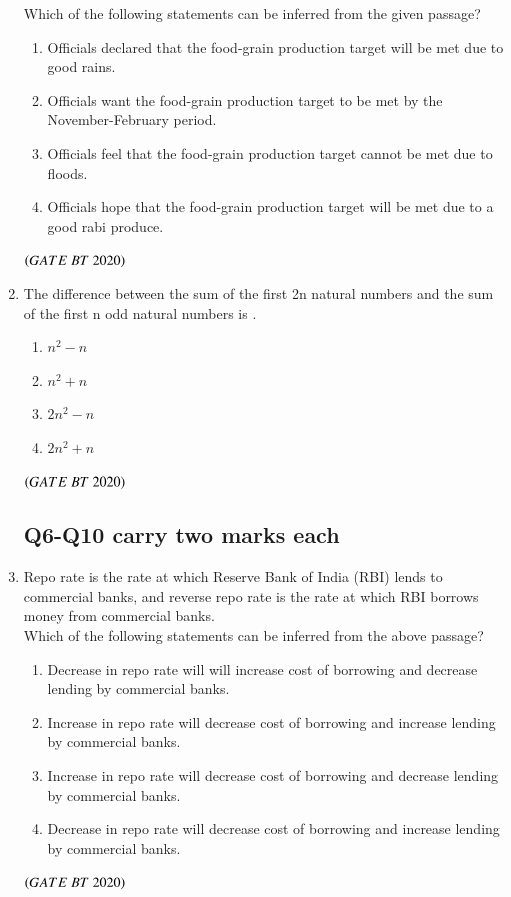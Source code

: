 \documentclass[journal,12pt,onecolumn]{IEEEtran}
\theoremstyle{remark}
\begin{document}
\begin{enumerate}[label=Q\arabic*:]
Which of the following statements can be inferred from the given passage?
\begin{multicols}{2}
\begin{enumerate}

\item Officials declared that the food-grain production target will be met due to good rains.
\item Officials want the food-grain production target to be met by the November-February period.
\item Officials feel that the food-grain production target cannot be met due to floods.
\item Officials hope that the food-grain production target will be met due to a good rabi produce.

\end{enumerate}
\end{multicols}
\hfill$\left(GATE\ BT\ 2020\right)$

\item The difference between the sum of the first 2n natural numbers and the sum of the first n odd natural numbers is .
\begin{multicols}{4}
\begin{enumerate}
\item $n^2 - n$
\item $n^2 + n$
\item $2n^2 - n$
\item $2n^2 + n$
\end{enumerate}
\end{multicols}
\hfill$\left(GATE\ BT\ 2020\right)$

\subsection*{Q6-Q10 carry two marks each}

\item Repo rate is the rate at which Reserve Bank of India (RBI) lends to commercial banks, and reverse repo rate is the rate at which RBI borrows money from commercial banks.\\

Which of the following statements can be inferred from the above passage?
\begin{multicols}{2}
\begin{enumerate}
\item Decrease in repo rate will will increase cost of borrowing and decrease lending by commercial banks.
\item Increase in repo rate will decrease cost of borrowing and increase lending by commercial banks.
\item Increase in repo rate will decrease cost of borrowing and decrease lending by commercial banks.
\item Decrease in repo rate will decrease cost of borrowing and increase lending by commercial banks.
\end{enumerate}
\end{multicols}\hfill$\left(GATE\ BT\ 2020\right)$


\end{enumerate}
\end{document}
